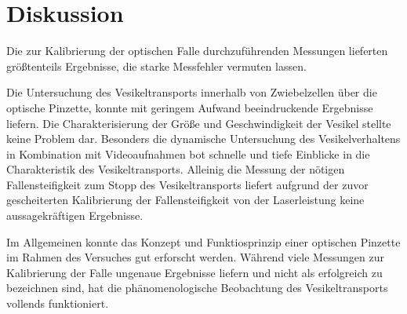 \newpage
\section{Diskussion}    
    Die zur Kalibrierung der optischen Falle durchzuführenden Messungen lieferten größtenteils Ergebnisse, die starke Messfehler vermuten lassen.

    Die Untersuchung des Vesikeltransports innerhalb von Zwiebelzellen über die optische Pinzette, konnte mit geringem Aufwand beeindruckende Ergebnisse liefern. Die Charakterisierung der Größe und
    Geschwindigkeit der Vesikel stellte keine Problem dar. Besonders die dynamische Untersuchung des Vesikelverhaltens in Kombination mit Videoaufnahmen bot schnelle und tiefe Einblicke in die
    Charakteristik des Vesikeltransports. Alleinig die Messung der nötigen Fallensteifigkeit zum Stopp des Vesikeltransports liefert aufgrund der zuvor gescheiterten Kalibrierung der Fallensteifigkeit
    von der Laserleistung keine aussagekräftigen Ergebnisse.   

    Im Allgemeinen konnte das Konzept und Funktiosprinzip einer optischen Pinzette im Rahmen des Versuches gut erforscht werden. Während viele Messungen zur Kalibrierung der Falle ungenaue Ergebnisse liefern
    und nicht als erfolgreich zu bezeichnen sind, hat die phänomenologische Beobachtung des Vesikeltransports vollends funktioniert. 

